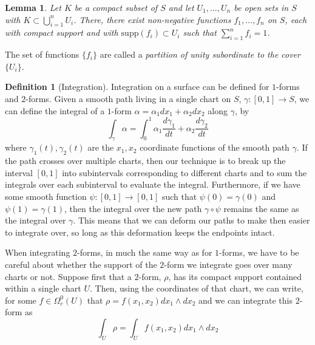 \documentclass[11pt]{report}
\newtheorem{lemma}[thm]{Lemma}
\theoremstyle{definition}
\newtheorem{defn}[thm]{Definition}
\begin{document}
\begin{lemma}\cite[Lemma 7]{donaldson}
  Let $K$ be a compact subset of $S$ and let $U_1,\ldots,U_n$ be open sets in $S$ with $K \subset \bigcup\limits_{i=1}^n U_i$. There, there exist non-negative functions $f_1,\ldots,f_n$ on $S$, each with compact support and with $\text{supp}(f_i) \subset U_i$ such that $\sum\limits_{i=1}^n f_i = 1$.
\end{lemma}
The set of functions $\{f_i\}$ are called a \emph{partition of unity subordinate to the cover $\{U_i\}$}.

\begin{defn}[Integration]\label{Integration}
  Integration on a surface can be defined for $1$-forms and $2$-forms. Given a smooth path living in a single chart on $S$, $\gamma \colon [0,1] \rightarrow S$, we can define the integral of a $1$-form $\alpha = \alpha_1 dx_1 + \alpha_2 dx_2$ along $\gamma$, by 
  \[\int_{\gamma}\alpha = \int_0^1\alpha_1\frac{d\gamma_1}{dt}+\alpha_2\frac{d\gamma_2}{dt}\] where $\gamma_1(t),\gamma_2(t)$ are the $x_1, x_2$ coordinate functions of the smooth path $\gamma$. If the path crosses over multiple charts, then our technique is to break up the interval $[0,1]$ into subintervals corresponding to different charts and to sum the integrals over each subinterval to evaluate the integral. Furthermore, if we have some smooth function $\psi \colon [0,1] \rightarrow [0,1]$ such that $\psi(0)=\gamma(0)$ and $\psi(1)=\gamma(1)$, then the integral over the new path $\gamma \circ \psi$ remains the same as the integral over $\gamma$. This means that we can deform our paths to make then easier to integrate over, so long as this deformation keeps the endpoints intact.

  When integrating $2$-forms, in much the same way as for $1$-forms, we have to be careful about whether the support of the $2$-form we integrate goes over many charts or not. Suppose first that a $2$-form, $\rho$, has its compact support contained within a single chart $U$. Then, using the coordinates of that chart, we can write, for some $f\in \Omega_c^0(U)$ that $\rho=f(x_1,x_2)dx_1\wedge dx_2$ and we can integrate this $2$-form as 
  \[\int_U \rho = \int_U f(x_1,x_2)dx_1\wedge dx_2\]
  

\end{defn}
\end{document}
